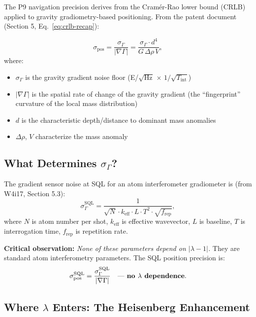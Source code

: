 \documentclass[11pt]{article}
\theoremstyle{definition}
\theoremstyle{remark}
\begin{document}
The P9 navigation precision derives from the Cram\'{e}r-Rao lower bound
(CRLB) applied to gravity gradiometry-based positioning. From the patent
document (Section 5, Eq.~\eqref{eq:crlb-recap}):

\begin{equation}\label{eq:crlb-recap}
  \sigma_{\text{pos}} = \frac{\sigma_\Gamma}{|\nabla\Gamma|}
  = \frac{\sigma_\Gamma \cdot d^4}{G \, \Delta\rho \, V},
\end{equation}
where:
\begin{itemize}
  \item $\sigma_\Gamma$ is the gravity gradient noise floor
    (E/$\sqrt{\text{Hz}}$ $\times$ $1/\sqrt{T_{\text{int}}}$)
  \item $|\nabla\Gamma|$ is the spatial rate of change of the gravity
    gradient (the ``fingerprint'' curvature of the local mass distribution)
  \item $d$ is the characteristic depth/distance to dominant mass anomalies
  \item $\Delta\rho$, $V$ characterize the mass anomaly
\end{itemize}

\subsection{What Determines $\sigma_\Gamma$?}

The gradient sensor noise at SQL for an atom interferometer gradiometer is
(from W4i17, Section 5.3):
\begin{equation}\label{eq:sigma-grad-SQL}
  \sigma_\Gamma^{\text{SQL}} = \frac{1}{\sqrt{N} \cdot k_{\text{eff}} \cdot L
  \cdot T^2 \cdot \sqrt{f_{\text{rep}}}},
\end{equation}
where $N$ is atom number per shot, $k_{\text{eff}}$ is effective wavevector,
$L$ is baseline, $T$ is interrogation time, $f_{\text{rep}}$ is repetition rate.

\textbf{Critical observation:} \emph{None of these parameters depend on
$|\lambda - 1|$.} They are standard atom interferometry parameters. The
SQL position precision is:
\begin{equation}
  \sigma_{\text{pos}}^{\text{SQL}} = \frac{\sigma_\Gamma^{\text{SQL}}}{|\nabla\Gamma|}
  \quad \text{--- \textbf{no $\lambda$ dependence}}.
\end{equation}

\subsection{Where $\lambda$ Enters: The Heisenberg Enhancement}
\end{document}

